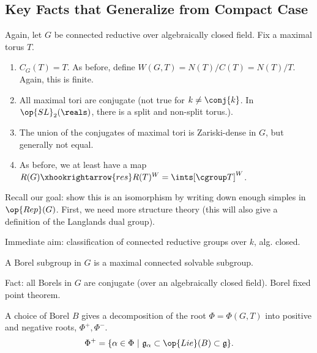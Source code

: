 \subsection{Key Facts that Generalize from Compact Case} Again, let $G$
be connected reductive over algebraically closed field. Fix a maximal torus $T$.

\begin{enumerate}[(1)]
\item $C_G(T) = T$. As before, define $W(G, T) = N(T)/C(T) = N(T)/T$. Again,
this is finite.
\item All maximal tori are conjugate (not true for $k \neq \conj{k}$. In 
$\op{SL}_2(\reals)$, there is a split and non-split torus.).
\item The union of the conjugates of maximal tori is Zariski-dense in $G$, but
generally not equal.
\item As before, we at least have a map $R(G) \xhookrightarrow{res} R(T)^W
= \ints[\cgroup T]^W$.
\end{enumerate}

Recall our goal: show this is an isomorphism by writing down enough simples in
$\op{Rep}(G)$. First, we need more structure theory (this will also give a
definition of the Langlands dual group). 

Immediate aim: classification of connected reductive groups over $k$, alg.
closed.

\begin{defn}
A Borel subgroup in $G$ is a maximal connected solvable subgroup.
\end{defn}

Fact: all Borels in $G$ are conjugate (over an algebraically closed field).
Borel fixed point theorem.

A choice of Borel $B$ gives a decomposition of the root $\Phi = \Phi(G, T)$
into positive and negative roots, $\Phi^+, \Phi^-$. 
\[\Phi^+ = \{ \alpha \in \Phi \ | \ \mathfrak{g}_\alpha
    \subset \op{Lie}(B) \subset \mathfrak{g} \}.\]
